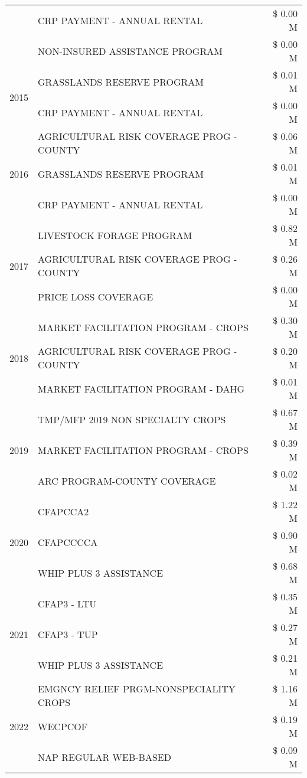 \begin{tabular}{llr}
 & CRP PAYMENT - ANNUAL RENTAL & \$ 0.00 M \\
 & NON-INSURED ASSISTANCE PROGRAM & \$ 0.00 M \\
\cline{1-3}
\multirow[t]{2}{*}{2015} & GRASSLANDS RESERVE PROGRAM & \$ 0.01 M \\
 & CRP PAYMENT - ANNUAL RENTAL & \$ 0.00 M \\
\cline{1-3}
\multirow[t]{3}{*}{2016} & AGRICULTURAL RISK COVERAGE PROG - COUNTY & \$ 0.06 M \\
 & GRASSLANDS RESERVE PROGRAM & \$ 0.01 M \\
 & CRP PAYMENT - ANNUAL RENTAL & \$ 0.00 M \\
\cline{1-3}
\multirow[t]{3}{*}{2017} & LIVESTOCK FORAGE PROGRAM & \$ 0.82 M \\
 & AGRICULTURAL RISK COVERAGE PROG - COUNTY & \$ 0.26 M \\
 & PRICE LOSS COVERAGE & \$ 0.00 M \\
\cline{1-3}
\multirow[t]{3}{*}{2018} & MARKET FACILITATION PROGRAM - CROPS & \$ 0.30 M \\
 & AGRICULTURAL RISK COVERAGE PROG - COUNTY & \$ 0.20 M \\
 & MARKET FACILITATION PROGRAM - DAHG & \$ 0.01 M \\
\cline{1-3}
\multirow[t]{3}{*}{2019} & TMP/MFP 2019 NON SPECIALTY CROPS & \$ 0.67 M \\
 & MARKET FACILITATION PROGRAM - CROPS & \$ 0.39 M \\
 & ARC PROGRAM-COUNTY COVERAGE & \$ 0.02 M \\
\cline{1-3}
\multirow[t]{3}{*}{2020} & CFAPCCA2 & \$ 1.22 M \\
 & CFAPCCCCA & \$ 0.90 M \\
 & WHIP PLUS 3 ASSISTANCE & \$ 0.68 M \\
\cline{1-3}
\multirow[t]{3}{*}{2021} & CFAP3 - LTU & \$ 0.35 M \\
 & CFAP3 - TUP & \$ 0.27 M \\
 & WHIP PLUS 3 ASSISTANCE & \$ 0.21 M \\
\cline{1-3}
\multirow[t]{3}{*}{2022} & EMGNCY RELIEF PRGM-NONSPECIALITY CROPS & \$ 1.16 M \\
 & WECPCOF & \$ 0.19 M \\
 & NAP REGULAR WEB-BASED & \$ 0.09 M \\
\cline{1-3}
\bottomrule
\end{tabular}
